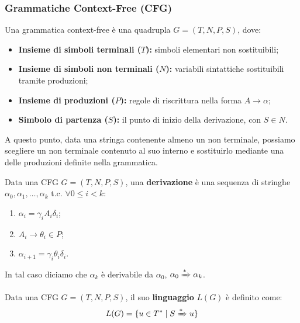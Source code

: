 \documentclass[12pt]{article}
\begin{document}
\subsubsection{Grammatiche Context-Free (CFG)}
\begin{definition}
Una grammatica context-free è una quadrupla $G = (T, N, P, S)$, dove:
\begin{itemize}
    \item \textbf{Insieme di simboli terminali ($T$):} simboli elementari non sostituibili;
    \item \textbf{Insieme di simboli non terminali ($N$):} variabili sintattiche sostituibili tramite produzioni;
    \item \textbf{Insieme di produzioni ($P$):} regole di riscrittura nella forma $A \to \alpha$;
    \item \textbf{Simbolo di partenza ($S$):} il punto di inizio della derivazione, con $S \in N$.
\end{itemize}
\end{definition}
\noindent A questo punto, data una stringa contenente almeno un non terminale, possiamo scegliere un non terminale contenuto al suo interno e sostituirlo mediante una delle produzioni definite nella grammatica.
\begin{definition} [Derivazione]
Data una CFG $G = (T, N, P, S)$, una \textbf{derivazione} è una sequenza di stringhe $\alpha_0, \alpha_1, \dots, \alpha_k$ t.c. $\forall 0 \leq i < k$:
\begin{enumerate}
    \item $\alpha_i = \gamma_i A_i \delta_i$;
    \item $A_i \to \theta_i \in P$;
    \item $\alpha_{i+1} = \gamma_i \theta_i \delta_i$.
\end{enumerate}
In tal caso diciamo che $\alpha_k$ è derivabile da $\alpha_0$, $\alpha_0 \xRightarrow{*} \alpha_k$.
\end{definition}
\begin{definition} 
Data una CFG $G = (T, N, P, S)$, il suo \textbf{linguaggio} $L(G)$ è definito come:
$$L(G) = \{ u \in T^* \mid S \xRightarrow{*} u \}$$
\end{definition}
\end{document}
